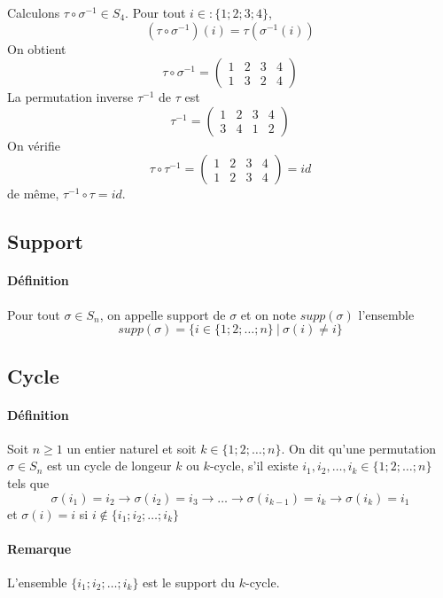 Calculons $\tau \circ \sigma^{-1} \in S_4$. Pour tout $i \in :\{1; 2; 3; 4\}$,
$$(\tau \circ \sigma^{-1})(i) = \tau(\sigma^{-1}(i))$$
On obtient
$$\tau \circ \sigma^{-1} = \begin{pmatrix} 1 & 2 & 3 & 4 \\ 1 & 3 & 2 & 4 \end{pmatrix}$$
La permutation inverse $\tau^{-1}$ de $\tau$ est
$$\tau^{-1} = \begin{pmatrix} 1 & 2 & 3 & 4 \\ 3 & 4 & 1 & 2 \end{pmatrix}$$
On vérifie
$$\tau \circ \tau^{-1} = \begin{pmatrix} 1 & 2 & 3 & 4 \\ 1 & 2 & 3 & 4 \end{pmatrix} = id$$
de même, $\tau^{-1} \circ \tau=id$.

%
\subsection{Support}
%
\paragraph{Définition} Pour tout $\sigma \in S_n$, on appelle support de $\sigma$ et on note $supp(\sigma)$ l'ensemble
$$supp(\sigma) = \{i \in \{1; 2; \ldots; n\} ~ \vert ~ \sigma(i) \neq i\}$$

%
\subsection{Cycle}
%
\paragraph{Définition} Soit $n \geq 1$ un entier naturel et soit $k \in \{1; 2; \ldots; n\}$. On dit qu'une permutation $\sigma \in S_n$ est un cycle de longeur $k$ ou $k$-cycle, s'il existe $i_1, i_2, \ldots, i_k \in  \{1; 2; \ldots; n\}$ tels que
$$\sigma(i_1) = i_2 \rightarrow \sigma(i_2) = i_3 \rightarrow \ldots \rightarrow \sigma(i_{k-1}) = i_k \rightarrow \sigma(i_k) = i_1$$
et $\sigma(i) = i$ si $i \notin \{i_1; i_2; \ldots; i_k\}$

\paragraph{Remarque} L'ensemble $\{i_1; i_2; \ldots; i_k\}$ est le support du $k$-cycle.

